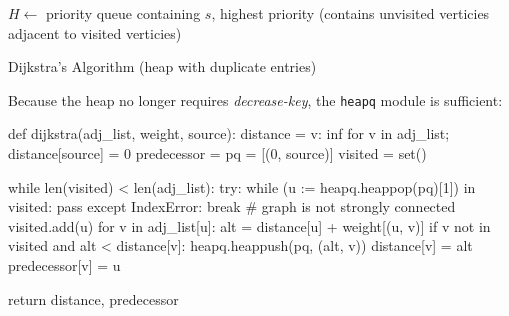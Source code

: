 \documentclass[12pt, titlepage]{article}
\begin{document}
\begin{algorithm}[H]
  \SetAlgoLined
  \DontPrintSemicolon

  $H \longleftarrow$\hspace{0.5mm} priority queue containing $s$, highest priority\;
  \hspace{13mm}(contains unvisited verticies adjacent to visited verticies)\;

  \;
    \caption{Dijkstra's Algorithm (heap with duplicate entries)}
\end{algorithm} \medskip

Because the heap no longer requires \textit{decrease-key}, the \texttt{heapq} module is sufficient: \medskip

\begin{python}
def dijkstra(adj_list, weight, source):
    distance = {v: inf for v in adj_list}; distance[source] = 0
    predecessor = {}
    pq = [(0, source)]
    visited = set()

    while len(visited) < len(adj_list):
        try:
            while (u := heapq.heappop(pq)[1]) in visited: pass
        except IndexError:
            break  # graph is not strongly connected
        visited.add(u)
        for v in adj_list[u]:
            alt = distance[u] + weight[(u, v)]
            if v not in visited and alt < distance[v]:
                heapq.heappush(pq, (alt, v))
                distance[v] = alt
                predecessor[v] = u

    return distance, predecessor
\end{python}
\end{document}
